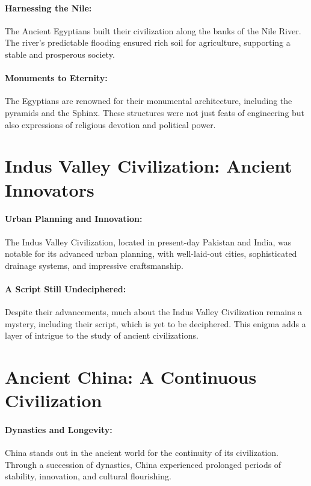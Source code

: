 \documentclass{book}
\begin{document}
\paragraph{Harnessing the Nile:}
The Ancient Egyptians built their civilization along the banks of the Nile River. The river's predictable flooding ensured rich soil for agriculture, supporting a stable and prosperous society.

\paragraph{Monuments to Eternity:}
The Egyptians are renowned for their monumental architecture, including the pyramids and the Sphinx. These structures were not just feats of engineering but also expressions of religious devotion and political power.

\section*{Indus Valley Civilization: Ancient Innovators}

\paragraph{Urban Planning and Innovation:}
The Indus Valley Civilization, located in present-day Pakistan and India, was notable for its advanced urban planning, with well-laid-out cities, sophisticated drainage systems, and impressive craftsmanship.

\paragraph{A Script Still Undeciphered:}
Despite their advancements, much about the Indus Valley Civilization remains a mystery, including their script, which is yet to be deciphered. This enigma adds a layer of intrigue to the study of ancient civilizations.

\section*{Ancient China: A Continuous Civilization}

\paragraph{Dynasties and Longevity:}
China stands out in the ancient world for the continuity of its civilization. Through a succession of dynasties, China experienced prolonged periods of stability, innovation, and cultural flourishing.
\end{document}
